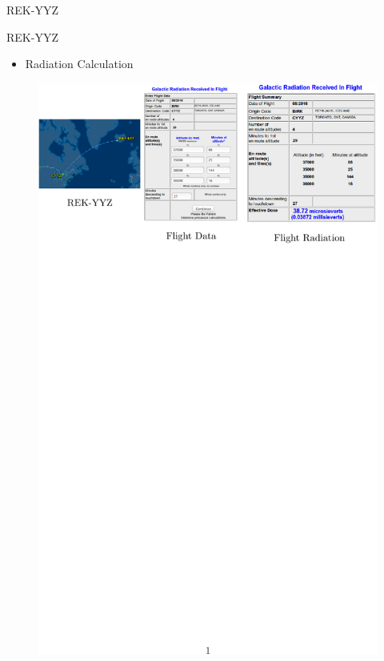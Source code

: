\documentclass[aspectratio=1610]{beamer}
\newcommand{\semitransp}[2][35]{\color{fg!#1}#2}
\begin{document}
\begin{frame}{REK-YYZ}

\begin{block}{REK-YYZ}
\end{block}
\begin{itemize}
\item Radiation Calculation

\end{itemize}
\vspace{-0.5cm}
\begin{figure}[]

   \includegraphics[scale=1.1]{images/REK-TO-YYZ.pdf}   
 \end{figure} 

\end{frame}
\end{document}
